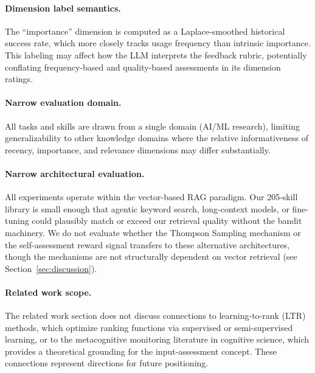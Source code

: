 \paragraph{Dimension label semantics.}
The ``importance'' dimension is computed as a Laplace-smoothed historical success rate, which more closely tracks usage frequency than intrinsic importance.
This labeling may affect how the LLM interprets the feedback rubric, potentially conflating frequency-based and quality-based assessments in its dimension ratings.

\paragraph{Narrow evaluation domain.}
All tasks and skills are drawn from a single domain (AI/ML research), limiting generalizability to other knowledge domains where the relative informativeness of recency, importance, and relevance dimensions may differ substantially.

\paragraph{Narrow architectural evaluation.}
All experiments operate within the vector-based RAG paradigm.
Our 205-skill library is small enough that agentic keyword search, long-context models, or fine-tuning could plausibly match or exceed our retrieval quality without the bandit machinery.
We do not evaluate whether the Thompson Sampling mechanism or the self-assessment reward signal transfers to these alternative architectures, though the mechanisms are not structurally dependent on vector retrieval (see Section~\ref{sec:discussion}).

\paragraph{Related work scope.}
The related work section does not discuss connections to learning-to-rank (LTR) methods, which optimize ranking functions via supervised or semi-supervised learning, or to the metacognitive monitoring literature in cognitive science, which provides a theoretical grounding for the input-assessment concept.
These connections represent directions for future positioning.
